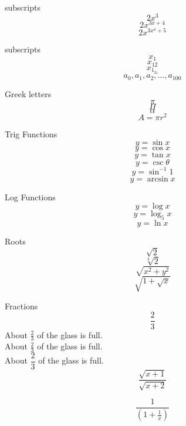 \documentclass[12pt]{article}
\begin{document}
subscripts $$2x^3$$
$$2x^{3x+4}$$
$$2x^{3x^4 + 5}$$


subscripts
$$x_1$$
$$x_{12}$$
$$x_{1_{2_3}}$$
$$a_0,a_1,a_2, \dots, a_{100}$$

Greek letters 
$$\pi$$
$$\Pi$$
$$\alpha$$
$$A= \pi {r^2}$$

Trig Functions
$$y= \sin x$$
$$y= \cos x$$
$$y= \tan x$$
$$y= \csc \theta$$
$$y= \sin^{-1} 1$$
$$y= \arcsin x$$

Log  Functions
$$y= \log x$$
$$y= \log_5 x$$
$$y= \ln x$$

Roots
$$\sqrt{2}$$
$$\sqrt[3]{2}$$
$$\sqrt{x^2+y^2}$$
$$\sqrt{ 1+\sqrt{x}    }$$

Fractions
$$\frac{2}{3}$$
About $\displaystyle \frac{2}{3}$ of the glass is full. \\[8pt]
About $\frac{2}{3}$ of the glass is full.\\[8pt]
About $\dfrac{2}{3}$ of the glass is full.
$$\frac{\sqrt{x+1}}{\sqrt{x+2}}$$

$$\frac{1}{(1+ \frac{1}{x})}$$
\end{document}

